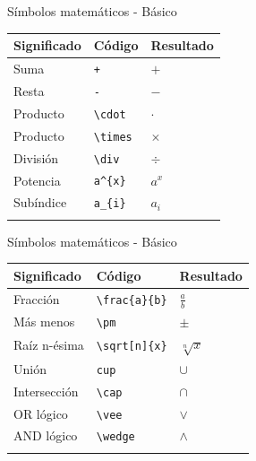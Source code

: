 \documentclass[
  ignorenonframetext,
  aspectratio=169]{beamer}
\begin{document}
\begin{frame}[fragile]{Símbolos matemáticos - Básico}
\label{suxedmbolos-matemuxe1ticos---buxe1sico}
\begin{longtable}[]{@{}lll@{}}
\toprule\noalign{}
Significado & Código & Resultado \\
\midrule\noalign{}
\endhead
Suma & \texttt{+} & \(+\) \\
Resta & \texttt{-} & \(-\) \\
Producto & \texttt{\textbackslash{}cdot} & \(\cdot\) \\
Producto & \texttt{\textbackslash{}times} & \(\times\) \\
División & \texttt{\textbackslash{}div} & \(\div\) \\
Potencia & \texttt{a\^{}\{x\}} & \(a^{x}\) \\
Subíndice & \texttt{a\_\{i\}} & \(a_{i}\) \\
\bottomrule\noalign{}
\end{longtable}
\end{frame}

\begin{frame}[fragile]{Símbolos matemáticos - Básico}
\label{suxedmbolos-matemuxe1ticos---buxe1sico-1}
\begin{longtable}[]{@{}lll@{}}
\toprule\noalign{}
Significado & Código & Resultado \\
\midrule\noalign{}
\endhead
Fracción & \texttt{\textbackslash{}frac\{a\}\{b\}} & \(\frac{a}{b}\) \\
Más menos & \texttt{\textbackslash{}pm} & \(\pm\) \\
Raíz n-ésima & \texttt{\textbackslash{}sqrt{[}n{]}\{x\}} &
\(\sqrt[n]{x}\) \\
Unión & \texttt{cup} & \(\cup\) \\
Intersección & \texttt{\textbackslash{}cap} & \(\cap\) \\
OR lógico & \texttt{\textbackslash{}vee} & \(\vee\) \\
AND lógico & \texttt{\textbackslash{}wedge} & \(\wedge\) \\
\bottomrule\noalign{}
\end{longtable}
\end{frame}
\end{document}
